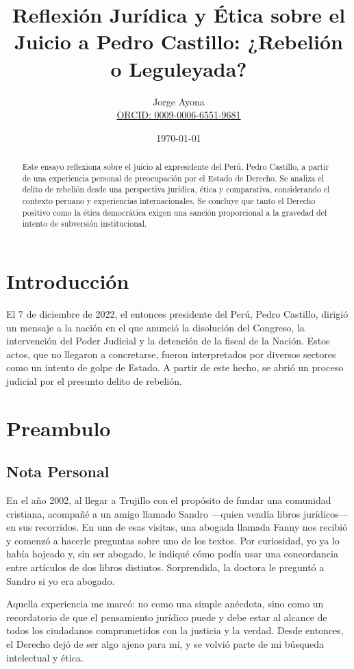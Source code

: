 \documentclass[12pt]{article}
\title{Reflexión Jurídica y Ética sobre el Juicio a Pedro Castillo: ¿Rebelión o Leguleyada?}
\author{Jorge Ayona \\ \href{https://orcid.org/0009-0006-6551-9681 }{ORCID: 0009-0006-6551-9681}}
\date{\today}
\begin{document}
	
	\maketitle
	
	\begin{abstract}
		Este ensayo reflexiona sobre el juicio al expresidente del Perú, Pedro Castillo, a partir de una experiencia personal de preocupación por el Estado de Derecho. Se analiza el delito de rebelión desde una perspectiva jurídica, ética y comparativa, considerando el contexto peruano y experiencias internacionales. Se concluye que tanto el Derecho positivo como la ética democrática exigen una sanción proporcional a la gravedad del intento de subversión institucional.
	\end{abstract}
	
	\section*{Introducción}
	
	El 7 de diciembre de 2022, el entonces presidente del Perú, Pedro Castillo, dirigió un mensaje a la nación en el que anunció la disolución del Congreso, la intervención del Poder Judicial y la detención de la fiscal de la Nación. Estos actos, que no llegaron a concretarse, fueron interpretados por diversos sectores como un intento de golpe de Estado. A partir de este hecho, se abrió un proceso judicial por el presunto delito de rebelión.
	
	\section*{Preambulo}
	
	\subsection*{Nota Personal}
	En el año 2002, al llegar a Trujillo con el propósito de fundar una comunidad cristiana, acompañé a un amigo llamado Sandro —quien vendía libros jurídicos— en sus recorridos. En una de esas visitas, una abogada llamada Fanny nos recibió y comenzó a hacerle preguntas sobre uno de los textos. Por curiosidad, yo ya lo había hojeado y, sin ser abogado, le indiqué cómo podía usar una concordancia entre artículos de dos libros distintos. Sorprendida, la doctora le preguntó a Sandro si yo era abogado.
	
	Aquella experiencia me marcó: no como una simple anécdota, sino como un recordatorio de que el pensamiento jurídico puede y debe estar al alcance de todos los ciudadanos comprometidos con la justicia y la verdad. Desde entonces, el Derecho dejó de ser algo ajeno para mí, y se volvió parte de mi búsqueda intelectual y ética.
	
\end{document}
